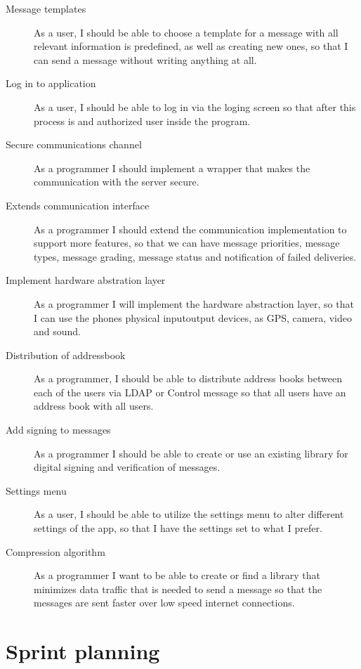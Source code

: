 \documentclass[a4paper, norsk, 12pt]{article}
\begin{document}
\begin{description}
			\item[Message templates] As a user, I should be able to choose a template for a message with all relevant information is predefined, as well as creating new ones, so that I can send a message without writing anything at all.
			\item[Log in to application] As a user, I should be able to log in via the loging screen so that after this process is and authorized user inside the program.
			\item[Secure communications channel] As a programmer I should implement a wrapper that makes the communication with the server secure.
			\item[Extends communication interface] As a programmer I should extend the communication implementation to support more features, so that we can have message priorities, message types, message grading, message status and notification of failed deliveries.
			\item[Implement hardware abstration layer] As a programmer I will implement the hardware abstraction layer, so that I can use the phones physical input\/output devices, as GPS, camera, video and sound. 
			\item[Distribution of addressbook] As a programmer, I should be able to distribute address books between each of the users via LDAP or Control message so that all users have an address book with all users.
			\item[Add signing to messages] As a programmer I should be able to create or use an existing library for digital signing and verification of messages.
			\item[Settings menu] As a user, I should be able to utilize the settings menu to alter different settings of the app, so that I have the settings set to what I prefer.
			\item[Compression algorithm] As a programmer I want to be able to create or find a library that minimizes data traffic that is needed to send a message so that the messages are sent faster over low speed internet connections.	
		\end{description}
	\pagebreak
	\section{Sprint planning}
\end{document}
